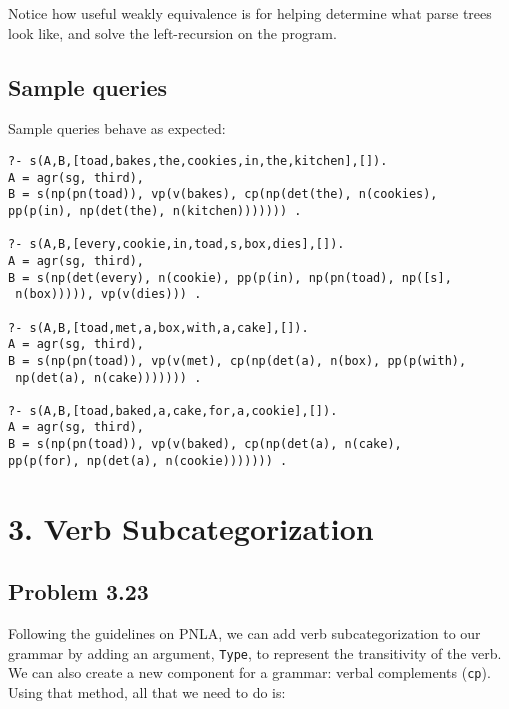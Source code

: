 \documentclass[12pt]{article}
\makeatletter
\newenvironment{problem x}{\@startsection
       {section}
       {1}
       {-.2em}
       {-3.5ex plus -1ex minus -.2ex}
       {2.3ex plus .2ex}
       {\pagebreak[3] %
       \large\bf\noindent{Problem }
       }
       }
       {%
       \begin{center}\large\bf \ldots\ldots\ldots\end{center}}
\makeatother
\begin{document}
    Notice how useful weakly equivalence is for helping determine what parse trees look like, and solve the left-recursion on the program.
    \subsection*{Sample queries}

    Sample queries behave as expected:
  \begin{verbatim}
?- s(A,B,[toad,bakes,the,cookies,in,the,kitchen],[]).
A = agr(sg, third),
B = s(np(pn(toad)), vp(v(bakes), cp(np(det(the), n(cookies),
pp(p(in), np(det(the), n(kitchen))))))) .

?- s(A,B,[every,cookie,in,toad,s,box,dies],[]).
A = agr(sg, third),
B = s(np(det(every), n(cookie), pp(p(in), np(pn(toad), np([s],
 n(box))))), vp(v(dies))) .

?- s(A,B,[toad,met,a,box,with,a,cake],[]).
A = agr(sg, third),
B = s(np(pn(toad)), vp(v(met), cp(np(det(a), n(box), pp(p(with),
 np(det(a), n(cake))))))) .

?- s(A,B,[toad,baked,a,cake,for,a,cookie],[]).
A = agr(sg, third),
B = s(np(pn(toad)), vp(v(baked), cp(np(det(a), n(cake), 
pp(p(for), np(det(a), n(cookie))))))) .
  \end{verbatim}

  \newpage
  \section*{3. Verb Subcategorization}
    \subsection*{Problem 3.23}

    Following the guidelines on PNLA, we can add verb subcategorization to our grammar by adding an argument, \texttt{Type}, to represent the transitivity of the verb. We can also create a new component for a grammar: verbal complements (\texttt{cp}). Using that method, all that we need to do is:
\end{document}
